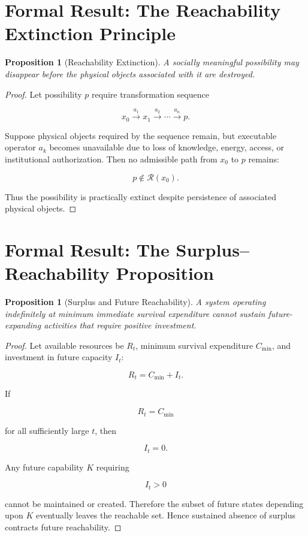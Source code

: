 \documentclass[11pt,oneside]{book}
\newtheorem{proposition}[theorem]{Proposition}
\theoremstyle{definition}
\theoremstyle{remark}
\newcommand{\R}{\mathcal{R}}
\begin{document}
\section{Formal Result: The Reachability Extinction Principle}

\begin{proposition}[Reachability Extinction] A socially meaningful possibility may disappear before
the physical objects associated with it are destroyed. \end{proposition} \begin{proof} Let
possibility \(p\) require transformation sequence

\[
x_0 \xrightarrow{a_1} x_1 \xrightarrow{a_2} \cdots \xrightarrow{a_n} p.
\]

Suppose physical objects required by the sequence remain, but executable operator \(a_k\) becomes
unavailable due to loss of knowledge, energy, access, or institutional authorization. Then no
admissible path from \(x_0\) to \(p\) remains:

\[
p\notin\R(x_0).
\]

Thus the possibility is practically extinct despite persistence of associated physical objects.
\end{proof}

\section{Formal Result: The Surplus--Reachability Proposition}

\begin{proposition}[Surplus and Future Reachability] A system operating indefinitely at minimum
immediate survival expenditure cannot sustain future-expanding activities that require positive
investment. \end{proposition} \begin{proof} Let available resources be \(R_t\), minimum survival
expenditure \(C_{\min}\), and investment in future capacity \(I_t\):

\[
R_t=C_{\min}+I_t.
\]

If

\[
R_t=C_{\min}
\]

for all sufficiently large \(t\), then

\[
I_t=0.
\]

Any future capability \(K\) requiring

\[
I_t>0
\]

cannot be maintained or created. Therefore the subset of future states depending upon \(K\)
eventually leaves the reachable set. Hence sustained absence of surplus contracts future
reachability. \end{proof}
\end{document}
